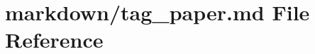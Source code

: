 \hypertarget{tag__paper_8md}{}\section{markdown/tag\+\_\+paper.md File Reference}
\label{tag__paper_8md}
